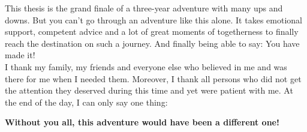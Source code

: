 This thesis is the grand finale of a three-year adventure with many ups and downs. But you can't go through an adventure like this alone. It takes emotional support, competent advice and a lot of great moments of togetherness to finally reach the destination on such a journey. And finally being able to say: You have made it!
\\

\noindent I thank my family, my friends and everyone else who believed in me and was there for me when I needed them. Moreover, I thank all persons who did not get the attention they deserved during this time and yet were patient with me. At the end of the day, I can only say one thing:
\begin{center}
    \textbf{Without you all, this adventure would have been a different one!}
\end{center}